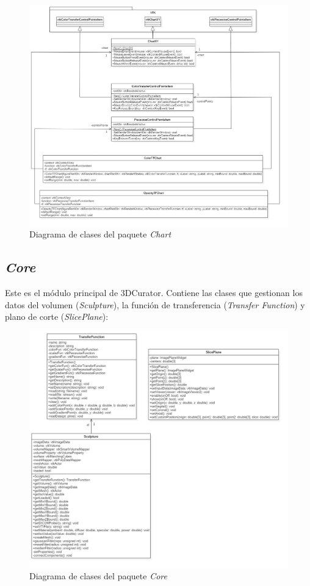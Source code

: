 \begin{figure}[H]
	\centering
	\includegraphics[width=12cm]{imagenes/diseno/chart}
	\caption{Diagrama de clases del paquete \textit{Chart}}
	\label{fig:diseno/chart}
\end{figure}

\subsection{\textit{Core}}

Este es el módulo principal de 3DCurator. Contiene las clases que gestionan los datos del volumen (\textit{Sculpture}), la función de transferencia (\textit{Transfer Function}) y plano de corte (\textit{SlicePlane}):

\begin{figure}[H]
	\centering
	\includegraphics[width=12cm]{imagenes/diseno/core}
	\caption{Diagrama de clases del paquete \textit{Core}}
	\label{fig:diseno/core}
\end{figure}

